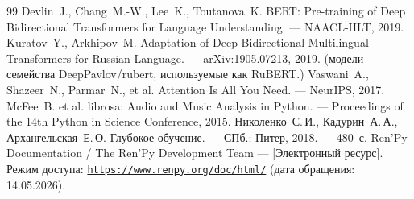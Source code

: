 \begin{thebibliography}{99}
Devlin~J., Chang~M.-W., Lee~K., Toutanova~K. BERT: Pre-training of Deep Bidirectional Transformers for Language Understanding. --- NAACL-HLT, 2019.
Kuratov~Y., Arkhipov~M. Adaptation of Deep Bidirectional Multilingual Transformers for Russian Language. --- arXiv:1905.07213, 2019. (модели семейства DeepPavlov/rubert, используемые как RuBERT.)
Vaswani~A., Shazeer~N., Parmar~N., et al. Attention Is All You Need. --- NeurIPS, 2017.
McFee~B. et al. librosa: Audio and Music Analysis in Python. --- Proceedings of the 14th Python in Science Conference, 2015.
Николенко~С.\,И., Кадурин~А.\,А., Архангельская~Е.\,О. Глубокое обучение. --- СПб.: Питер, 2018. --- 480~с.
Ren'Py Documentation / The Ren'Py Development Team --- [Электронный ресурс]. Режим доступа: \href{https://www.renpy.org/doc/html/}{\nolinkurl{https://www.renpy.org/doc/html/}} (дата обращения: 14.05.2026).
\end{thebibliography}
